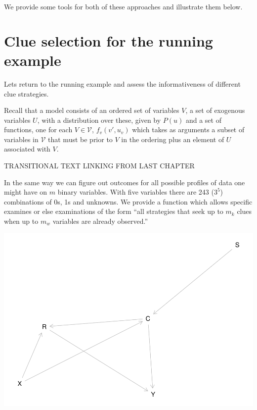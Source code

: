\documentclass[12pt,]{book}
\newenvironment{Shaded}{\begin{snugshade}}{\end{snugshade}}
\newcommand{\DataTypeTok}[1]{\textcolor[rgb]{0.13,0.29,0.53}{#1}}
\newcommand{\KeywordTok}[1]{\textcolor[rgb]{0.13,0.29,0.53}{\textbf{#1}}}
\newcommand{\NormalTok}[1]{#1}
\newcommand{\OperatorTok}[1]{\textcolor[rgb]{0.81,0.36,0.00}{\textbf{#1}}}
\newcommand{\StringTok}[1]{\textcolor[rgb]{0.31,0.60,0.02}{#1}}
\begin{document}
We provide some tools for both of these approaches and illustrate them below.

\hypertarget{clue-selection-for-the-running-example}{%
\section{Clue selection for the running example}\label{clue-selection-for-the-running-example}}

Lets return to the running example and assess the informativeness of different clue strategies.

Recall that a model consists of an ordered set of variables \(V\), a set of exogenous variables \(U\), with a distribution over these, given by \(P(u)\) and a set of functions, one for each \(V\in\mathcal{V}\), \(f_v(v',u_v)\) which takes as arguments a subset of variables in \(\mathcal{V}\) that must be prior to \(V\) in the ordering plus an element of \(U\) associated with \(V\).

TRANSITIONAL TEXT LINKING FROM LAST CHAPTER

In the same way we can figure out outcomes for all possible profiles of data one might have on \(m\) binary variables. With five variables there are 243 (\(3^5\)) combinations of 0s, 1s and unknowns. We provide a function which allows specific examines or else examinations of the form ``all strategies that seek up to \(m_k\) clues when up to \(m_w\) variables are already observed.''

\begin{Shaded}
\end{Shaded}

\includegraphics{ii_files/figure-latex/ch11strategies_chunk_slowxx-1.pdf}
\end{document}
